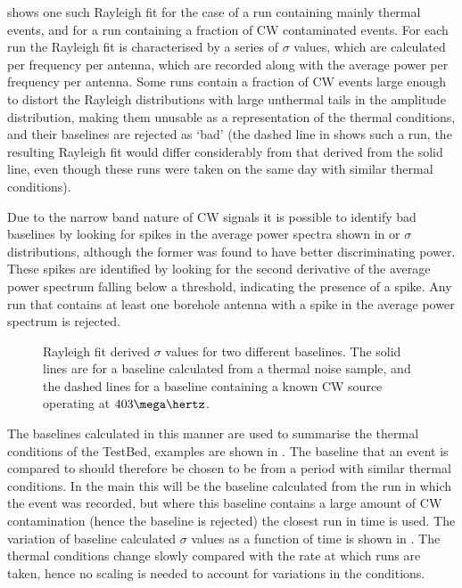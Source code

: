  shows one such Rayleigh fit for the case of a run containing mainly thermal events, and for a run containing a fraction of CW contaminated events. For each run the Rayleigh fit is characterised by a series of $\sigma$ values, which are calculated per frequency per antenna, which are recorded along with the average power per frequency per antenna. Some runs contain a fraction of CW events large enough to distort the Rayleigh distributions with large unthermal tails in the amplitude distribution, making them unusable as a representation of the thermal conditions, and their baselines are rejected as `bad' (the dashed line in  shows such a run, the resulting Rayleigh fit would differ considerably from that derived from the solid line, even though these runs were taken on the same day with similar thermal conditions). 

Due to the narrow band nature of CW signals it is possible to identify bad baselines by looking for spikes in the average power spectra shown in  or $\sigma$ distributions, although the former was found to have better discriminating power. These spikes are identified by looking for the second derivative of the average power spectrum falling below a threshold, indicating the presence of a spike. Any run that contains at least one borehole antenna with a spike in the average power spectrum is rejected. 

\begin{figure}[htpb]
  \hfill
  \caption{Rayleigh fit derived $\sigma$ values for two different baselines. The solid lines are for a baseline calculated from a thermal noise sample, and the dashed lines for a baseline containing a known CW source operating at $403 \mega \hertz$.} 
  \label{fig:analysis:CWRemoval:Baselines:Rayleigh-Sigma}
\end{figure}

The baselines calculated in this manner are used to summarise the thermal conditions of the TestBed, examples are shown in . The baseline that an event is compared to should therefore be chosen to be from a period with similar thermal conditions. In the main this will be the baseline calculated from the run in which the event was recorded, but where this baseline contains a large amount of CW contamination (hence the baseline is rejected) the closest run in time is used. The variation of baseline calculated $\sigma$ values as a function of time is shown in . The thermal conditions change slowly compared with the rate at which runs are taken, hence no scaling is needed to account for variations in the conditions. 


